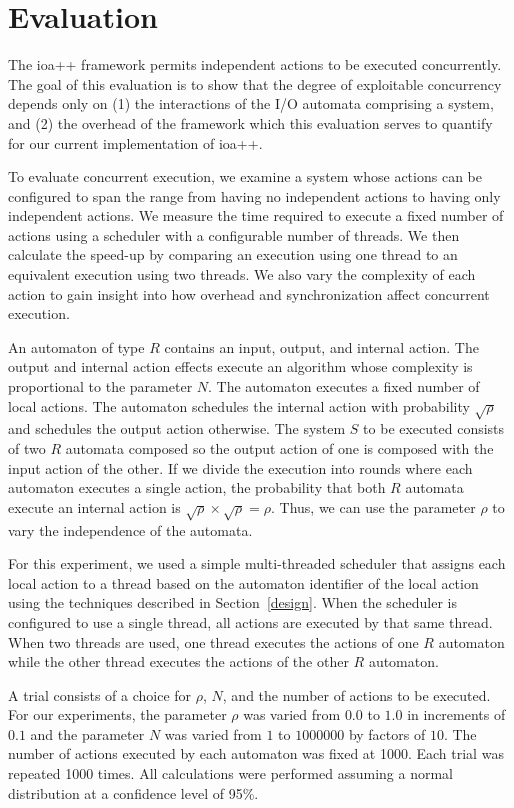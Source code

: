 \section{Evaluation\label{evaluation}}

The ioa++ framework permits independent actions to be executed concurrently.
The goal of this evaluation is to show that the degree of exploitable concurrency depends only on (1) the interactions of the I/O automata comprising a system, and (2) the overhead of the framework which this evaluation serves to quantify for our current implementation of ioa++.

To evaluate concurrent execution, we examine a system whose actions can be configured to span the range from having no independent actions to having only independent actions.
We measure the time required to execute a fixed number of actions using a scheduler with a configurable number of threads.
We then calculate the speed-up by comparing an execution using one thread to an equivalent execution using two threads.
We also vary the complexity of each action to gain insight into how overhead and synchronization affect concurrent execution.

An automaton of type $R$ contains an input, output, and internal action.
The output and internal action effects execute an algorithm whose complexity is proportional to the parameter $N$.
The automaton executes a fixed number of local actions.
The automaton schedules the internal action with probability $\sqrt{\rho}$ and schedules the output action otherwise.
The system $S$ to be executed consists of two $R$ automata composed so the output action of one is composed with the input action of the other.
If we divide the execution into rounds where each automaton executes a single action, the probability that both $R$ automata execute an internal action is $\sqrt{\rho} \times \sqrt{\rho} = \rho$.
Thus, we can use the parameter $\rho$ to vary the independence of the automata.

For this experiment, we used a simple multi-threaded scheduler that assigns each local action to a thread based on the automaton identifier of the local action using the techniques described in Section~\ref{design}.
When the scheduler is configured to use a single thread, all actions are executed by that same thread.
When two threads are used, one thread executes the actions of one $R$ automaton while the other thread executes the actions of the other $R$ automaton.

A trial consists of a choice for $\rho$, $N$, and the number of actions to be executed.
For our experiments, the parameter $\rho$ was varied from $0.0$ to $1.0$ in increments of $0.1$ and the parameter $N$ was varied from $1$ to $1000000$ by factors of $10$.
The number of actions executed by each automaton was fixed at 1000.
Each trial was repeated 1000 times.
All calculations were performed assuming a normal distribution at a confidence level of 95\%.

